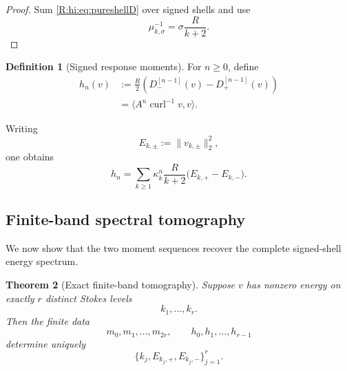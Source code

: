 \documentclass[
 aps,
 prd,
 reprint,
 amsmath,
 amssymb,
 nofootinbib,
 superscriptaddress
]{revtex4-2}
\newtheorem{theorem}{Theorem}[section]
\theoremstyle{definition}
\newtheorem{definition}[theorem]{Definition}
\theoremstyle{remark}
\newcommand{\curl}{\operatorname{curl}}
\begin{document}
\begin{proof}
Sum \eqref{R:hi:eq:pureshellD} over signed shells and use
\[
       \mu_{k,\sigma}^{-1}
       =
       \sigma\frac{R}{k+2}.
\]
\end{proof}

\begin{definition}[Signed response moments]
For $n\ge0$, define
\begin{equation}
\begin{aligned}
 h_n(v)
 &:=
 \frac{R}{2}
 \left(
 D_-^{[n-1]}(v)-D_+^{[n-1]}(v)
 \right)\\
 &=
 \langle A^n\curl^{-1}v,v\rangle.
\end{aligned}
\label{R:hi:eq:hn}
\end{equation}
\end{definition}

Writing
\[
 E_{k,\pm}
 :=
 \|v_{k,\pm}\|_2^2,
\]
one obtains
\begin{equation}
 \boxed{
 h_n
 =
 \sum_{k\ge1}
 \kappa_k^n
 \frac{R}{k+2}
 \bigl(E_{k,+}-E_{k,-}\bigr).
 }
 \label{R:hi:eq:hmoments}
\end{equation}

\subsection{Finite-band spectral tomography}

We now show that the two moment sequences recover the complete signed-shell
energy spectrum.

\begin{theorem}[Exact finite-band tomography]
\label{R:hi:thm:tomography}
Suppose $v$ has nonzero energy on exactly $r$ distinct Stokes levels
\[
       k_1,\ldots,k_r.
\]
Then the finite data
\begin{equation}
 m_0,m_1,\ldots,m_{2r},
 \qquad
 h_0,h_1,\ldots,h_{r-1}
 \label{R:hi:eq:tomodata}
\end{equation}
determine uniquely
\[
       \{k_j,E_{k_j,+},E_{k_j,-}\}_{j=1}^r.
\]
\end{theorem}
\end{document}

